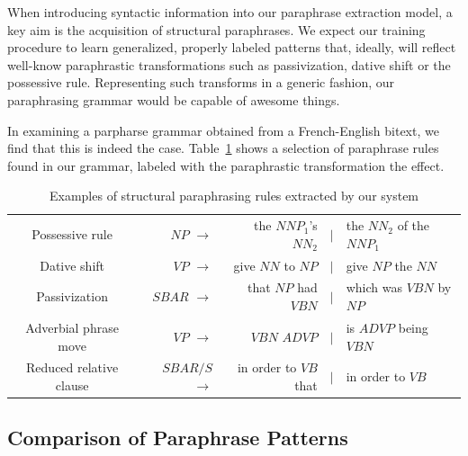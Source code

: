 \documentclass[11pt]{article}
\begin{document}
When introducing syntactic information into our paraphrase extraction
model, a key aim is the acquisition of structural paraphrases. We
expect our training procedure to learn generalized, properly labeled
patterns that, ideally, will reflect well-know paraphrastic
transformations such as passivization, dative shift or the possessive
rule. Representing such transforms in a generic fashion, our
paraphrasing grammar would be capable of awesome things.

In examining a parpharse grammar obtained from a French-English
bitext, we find that this is indeed the
case. Table~\ref{example_rules} shows a selection of paraphrase rules
found in our grammar, labeled with the paraphrastic transformation the
effect.


\begin{table}
  \begin{center}
  \begin{tabular}{|c|rrcl|}
    \hline
    Possessive rule & $\mathit{NP}$ $\rightarrow$  & the $\mathit{NNP}_1$'s
    $\mathit{NN}_2$ & $\mid$ & the $\mathit{NN}_2$ of the $\mathit{NNP}_1$
    \\

    Dative shift & $\mathit{VP}$ $\rightarrow$ & give $\mathit{NN}$ to
    $\mathit{NP}$ & $\mid$ & give $\mathit{NP}$ the $\mathit{NN}$ \\

    Passivization &
    $\mathit{SBAR}$ $\rightarrow$ & that $\mathit{NP}$ had
    $\mathit{VBN}$ & $\mid$ & which was $\mathit{VBN}$ by $\mathit{NP}$ \\

    Adverbial phrase move & 
    $\mathit{VP}$ $\rightarrow$ & $\mathit{VBN}$ $\mathit{ADVP}$ & $\mid$ & is
    $\mathit{ADVP}$ being $\mathit{VBN}$ \\

    Reduced relative clause & $\mathit{SBAR/S}$ $\rightarrow$ & in order
    to $\mathit{VB}$ that & $\mid$ & in order to $\mathit{VB}$ \\
    \hline
\end{tabular}
\end{center}
\caption{Examples of structural paraphrasing rules extracted by our
  system}
\label{example_rules}
\end{table}

\subsection{Comparison of Paraphrase
  Patterns} \label{pattern_comparison}
\end{document}
